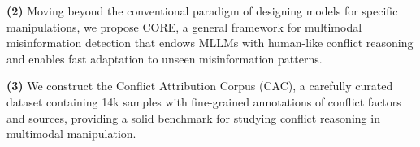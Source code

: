 \documentclass{article}
\theoremstyle{plain}
\theoremstyle{definition}
\theoremstyle{remark}
\begin{document}
\textbf{(2)} Moving beyond the conventional paradigm of designing models for specific manipulations, we propose CORE, a general framework for multimodal misinformation detection that endows MLLMs with human-like conflict reasoning and enables fast adaptation to unseen misinformation patterns. 

\textbf{(3)} We construct the Conflict Attribution Corpus (CAC), a carefully curated dataset containing 14k samples with fine-grained annotations of conflict factors and sources, providing a solid benchmark for studying conflict reasoning in multimodal manipulation.

\begin{table}[t]
\caption{World Knowledge Evaluation of Non-MLLMs and MLLMs.}
\label{tab:world_knowledge}
\centering

\hfill
{}
\end{table}
\end{document}
